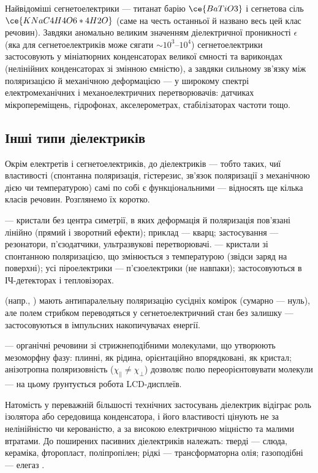 Найвідоміші сегнетоелектрики --- титанат барію $\ce{BaTiO3}$ і сегнетова сіль $\ce{KNaC4H4O6*4H2O}$ (саме на честь останньої й названо весь цей клас
речовин). Завдяки аномально великим значенням діелектричної проникності $\epsilon$ (яка для сегнетоелектриків може сягати $\sim 10^3$--$10^4$)
сегнетоелектрики застосовують у мініатюрних конденсаторах великої ємності та варикондах (нелінійних конденсаторах зі змінною ємністю), а завдяки
сильному зв'язку між поляризацією й механічною деформацією --- у широкому спектрі електромеханічних і механоелектричних перетворювачів: датчиках
мікропереміщень, гідрофонах, акселерометрах, стабілізаторах частоти тощо.

\subsection*{Інші типи діелектриків}\label{sec:PiezoPyro}

Окрім електретів і сегнетоелектриків, до  діелектриків --- тобто таких, чиї властивості (спонтанна поляризація, гістерезис, зв'язок поляризації з механічною дією чи температурою) самі по собі є функціональними --- відносять ще кілька класів речовин. Розглянемо їх коротко.

 --- кристали без центра симетрії, в яких деформація й поляризація пов'язані лінійно (прямий і зворотний ефекти); приклад --- кварц; застосування --- резонатори, п'єзодатчики, ультразвукові перетворювачі.  --- кристали зі спонтанною поляризацією, що змінюється з температурою (звідси заряд на поверхні); усі піроелектрики --- п'єзоелектрики (не навпаки); застосовуються в ІЧ-детекторах і тепловізорах.

 (напр., ) мають антипаралельну поляризацію сусідніх комірок (сумарно --- нуль), але полем стрибком переводяться у сегнетоелектричний стан без залишку --- застосовуються в імпульсних накопичувачах енергії.

 --- органічні речовини зі стрижнеподібними молекулами, що утворюють мезоморфну фазу: плинні, як рідина, орієнтаційно впорядковані, як кристал; анізотропна поляризовність ($\chi_\parallel\neq\chi_\perp$) дозволяє полю переорієнтовувати молекули --- на цьому ґрунтується робота LCD-дисплеїв.

Натомість у переважній більшості технічних застосувань діелектрик відіграє  роль ізолятора або середовища конденсатора, і його властивості цінують не за нелінійністю чи керованістю, а за високою електричною міцністю та малими втратами. До поширених пасивних діелектриків належать: тверді --- слюда, кераміка, фторопласт, поліпропілен; рідкі --- трансформаторна олія; газоподібні --- елегаз .

